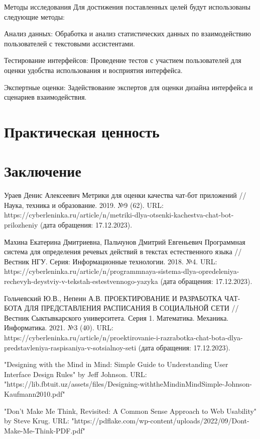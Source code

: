 \documentclass{article}
\begin{document}
Методы исследования
Для достижения поставленных целей будут использованы следующие методы:

Анализ данных: Обработка и анализ статистических данных по взаимодействию пользователей с текстовыми ассистентами.

Тестирование интерфейсов: Проведение тестов с участием пользователей для оценки удобства использования и восприятия интерфейса.

Экспертные оценки: Задействование экспертов для оценки дизайна интерфейса и сценариев взаимодействия.

\section{Практическая ценность}
\section{Заключение}




   
Ураев Денис Алексеевич Метрики для оценки качества чат-бот приложений // Наука, техника и образование. 2019. №9 (62). URL: https://cyberleninka.ru/article/n/metriki-dlya-otsenki-kachestva-chat-bot-prilozheniy (дата обращения: 17.12.2023).

Махина Екатерина Дмитриевна, Пальчунов Дмитрий Евгеньевич Программная система для определения речевых действий в текстах естественного языка // Вестник НГУ. Серия: Информационные технологии. 2018. №4. URL: https://cyberleninka.ru/article/n/programmnaya-sistema-dlya-opredeleniya-rechevyh-deystviy-v-tekstah-estestvennogo-yazyka (дата обращения: 17.12.2023).

Гольчевский Ю.В., Непеин А.В. ПРОЕКТИРОВАНИЕ И РАЗРАБОТКА ЧАТ-БОТА ДЛЯ ПРЕДСТАВЛЕНИЯ РАСПИСАНИЯ В СОЦИАЛЬНОЙ СЕТИ // Вестник Сыктывкарского университета. Серия 1. Математика. Механика. Информатика. 2021. №3 (40). URL: https://cyberleninka.ru/article/n/proektirovanie-i-razrabotka-chat-bota-dlya-predstavleniya-raspisaniya-v-sotsialnoy-seti (дата обращения: 17.12.2023).

"Designing with the Mind in Mind: Simple Guide to Understanding User Interface Design Rules" by Jeff Johnson. URL: "https://lib.fbtuit.uz/assets/files/Designing-withtheMindinMindSimple-Johnson-Kaufmann2010.pdf"

"Don't Make Me Think, Revisited: A Common Sense Approach to Web Usability" by Steve Krug. URL:
"https://pdflake.com/wp-content/uploads/2022/09/Dont-Make-Me-Think-PDF.pdf"
\end{document}
